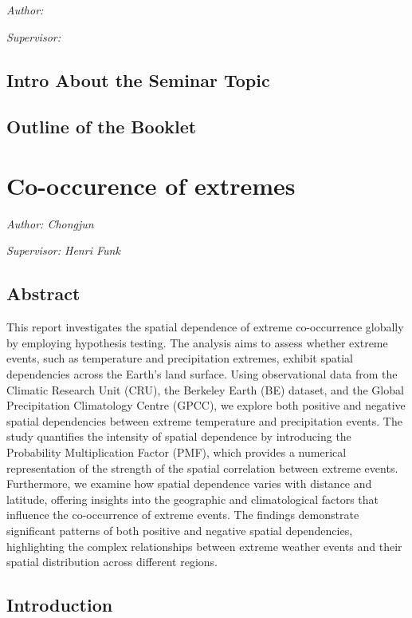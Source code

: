 \documentclass[
]{krantz}
\begin{document}
\emph{Author: }

\emph{Supervisor: }

\section{Intro About the Seminar Topic}\label{intro-about-the-seminar-topic}

\section{Outline of the Booklet}\label{outline-of-the-booklet}

\chapter{Co-occurence of extremes}\label{co-occurence-of-extremes}

\emph{Author: Chongjun }

\emph{Supervisor: Henri Funk}

\section{Abstract}\label{abstract-4}

This report investigates the spatial dependence of extreme co-occurrence globally by employing hypothesis testing. The analysis aims to assess whether extreme events, such as temperature and precipitation extremes, exhibit spatial dependencies across the Earth's land surface. Using observational data from the Climatic Research Unit (CRU), the Berkeley Earth (BE) dataset, and the Global Precipitation Climatology Centre (GPCC), we explore both positive and negative spatial dependencies between extreme temperature and precipitation events. The study quantifies the intensity of spatial dependence by introducing the Probability Multiplication Factor (PMF), which provides a numerical representation of the strength of the spatial correlation between extreme events. Furthermore, we examine how spatial dependence varies with distance and latitude, offering insights into the geographic and climatological factors that influence the co-occurrence of extreme events. The findings demonstrate significant patterns of both positive and negative spatial dependencies, highlighting the complex relationships between extreme weather events and their spatial distribution across different regions.

\section{Introduction}\label{introduction-2}
\end{document}
